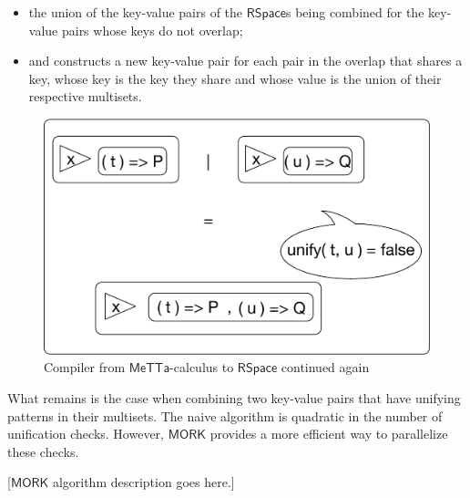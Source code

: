\begin{itemize}
  \item the union of the key-value pairs of the $\mathsf{RSpace}$s
    being combined for the key-value pairs whose keys do not overlap;
  \item and constructs a new key-value pair for each pair in the
    overlap that shares a key, whose key is the key they share and
    whose value is the union of their respective multisets.
\end{itemize}

\begin{figure}
  \centering
  \includegraphics[scale=0.5]{MeTTaCalcImpl3.pdf}
  \caption{Compiler from $\mathsf{MeTTa}$-calculus to $\mathsf{RSpace}$ continued again}
\end{figure}

What remains is the case when combining two key-value pairs that have
unifying patterns in their multisets. The naive algorithm is quadratic
in the number of unification checks. However, $\mathsf{MORK}$ provides
a more efficient way to parallelize these checks.

[$\mathsf{MORK}$ algorithm description goes here.]
